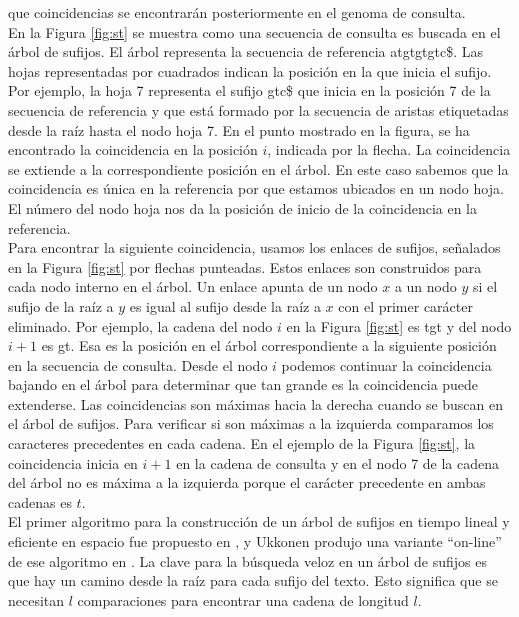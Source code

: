\documentclass[12pt,a4paper]{article}
\begin{document}
que coincidencias se encontrarán posteriormente en el genoma de consulta.\\
\indent
En la Figura \ref{fig:st} se muestra como una secuencia de consulta es buscada en el árbol de sufijos. El
árbol representa la secuencia de referencia atgtgtgtc\$. Las hojas representadas por cuadrados indican la
posición en la que inicia el sufijo. Por ejemplo, la hoja 7 representa el sufijo gtc\$ que inicia en la 
posición 7 de la secuencia de referencia y que está formado por la secuencia de aristas etiquetadas desde la
raíz hasta el nodo hoja 7. En el punto mostrado en la figura, se ha encontrado la coincidencia en la posición $i$,
indicada por la flecha. La coincidencia se extiende a la correspondiente posición en el árbol. En este caso sabemos
que la coincidencia es única en la referencia por que estamos ubicados en un nodo hoja. El número del nodo hoja
nos da la posición de inicio de la coincidencia en la referencia.\\
\indent
Para encontrar la siguiente coincidencia, usamos los enlaces de sufijos, señalados en la Figura \ref{fig:st} por
flechas punteadas. Estos enlaces son construidos para cada nodo interno en el árbol. Un enlace apunta de un nodo
$x$ a un nodo $y$ si el sufijo de la raíz a $y$ es igual al sufijo desde la raíz a $x$ con el primer carácter 
eliminado. Por ejemplo, la cadena del nodo $i$ en la Figura \ref{fig:st} es tgt y del nodo $i+1$ es gt. Esa es la
posición en el árbol correspondiente a la siguiente posición en la secuencia de consulta. Desde el nodo $i$ podemos
continuar la coincidencia bajando en el árbol para determinar que tan grande es la coincidencia puede extenderse. Las 
coincidencias son máximas hacia la derecha cuando se buscan en el árbol de sufijos. Para verificar si son máximas a
la izquierda comparamos los caracteres precedentes en cada cadena. En el ejemplo de la Figura \ref{fig:st}, la
coincidencia inicia en $i+1$ en la cadena de consulta y en el nodo 7 de la cadena del árbol no es máxima a la izquierda
porque el carácter precedente en ambas cadenas es $t$.\\
\indent
El primer algoritmo para la construcción de un árbol de sufijos en tiempo lineal 
y eficiente en espacio fue propuesto en \cite{McCreight:1976:SST:321941.321946}
, y Ukkonen produjo una variante ``on-line'' de ese algoritmo en \cite{Ukkonen1992}. 
La clave para la búsqueda veloz en un árbol de sufijos es que 
hay un camino desde la raíz para cada sufijo del texto. Esto significa que se 
necesitan $l$ comparaciones para encontrar una cadena de longitud $l$.\\
\end{document}
